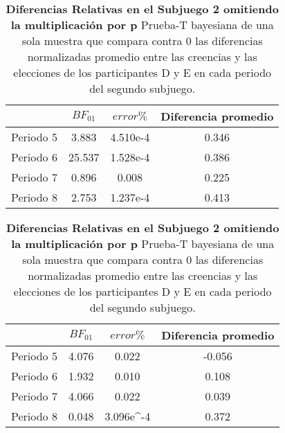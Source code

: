\begin{table}[h]
\caption[Subjuego 2. Diferencias Relativas sin la multiplicación por p (participantes A)]{\textbf{Diferencias Relativas en el Subjuego 2 omitiendo la multiplicación por p} Prueba-T bayesiana de una sola muestra que compara contra 0 las diferencias normalizadas promedio entre las creencias y las elecciones de los participantes D y E en cada periodo del segundo subjuego.}
\label{DRnop-S2-A-B}
\centering
\begin{tabular}{l | c c | c}
\toprule
\textbf{} & \textbf{$BF_{01}$} & \textbf{$error\%$} & \textbf{Diferencia promedio}\\
\midrule
Periodo 5 & 3.883 & 4.510e-4 & 0.346\\
Periodo 6 & 25.537 & 1.528e-4 & 0.386\\
Periodo 7 & 0.896 & 0.008 & 0.225\\
Periodo 8 & 2.753 & 1.237e-4 & 0.413\\
\bottomrule
\end{tabular}
\end{table}


\begin{table}[h]
\caption[Subjuego 2. Diferencias normalizadasDiferencias Relativas sin la multiplicación por p (participantes D y E)]{\textbf{Diferencias Relativas en el Subjuego 2 omitiendo la multiplicación por p} Prueba-T bayesiana de una sola muestra que compara contra 0 las diferencias normalizadas promedio entre las creencias y las elecciones de los participantes D y E en cada periodo del segundo subjuego.}
\label{DRnop-S2-DyE-B}
\centering
\begin{tabular}{l | c c | c}
\toprule
\textbf{} & \textbf{$BF_{01}$} & \textbf{$error\%$} & \textbf{Diferencia promedio}\\
\midrule
Periodo 5 & 4.076 & 0.022 & -0.056\\
Periodo 6 & 1.932 & 0.010 & 0.108\\
Periodo 7 & 4.066 & 0.022 & 0.039\\
Periodo 8 & 0.048 & 3.096e^-4 & 0.372\\
\bottomrule
\end{tabular}
\end{table}
  

